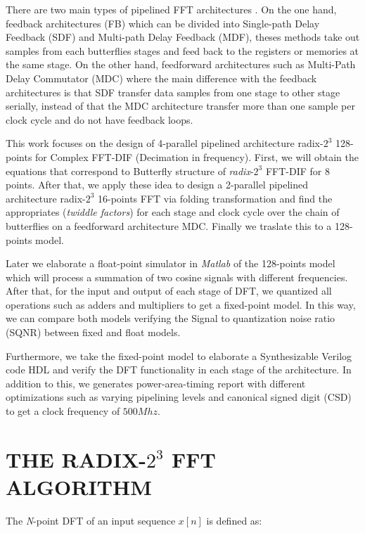 \documentclass[journal,comsoc]{IEEEtran}
\begin{document}
There are two main types of pipelined FFT architectures \cite{shousheng_he_designing_1998}. On the one hand, feedback architectures (FB) which can be divided into Single-path Delay Feedback (SDF) and Multi-path Delay Feedback (MDF), theses methods take out samples from each butterflies stages and feed back to the registers or memories at the same stage. On the other hand, feedforward architectures such as Multi-Path Delay Commutator (MDC) where the main difference with the feedback architectures is that SDF transfer data samples from one stage to other stage serially, instead of that the MDC architecture transfer more than one sample per clock cycle and do not have feedback loops.

This work focuses on the design of 4-parallel pipelined architecture radix-$2^3$ 128-points for Complex FFT-DIF (Decimation in frequency). First, we will obtain the equations that correspond to Butterfly structure of \textit{radix}-$2^3$ FFT-DIF for 8 points. After that, we apply these idea to design a 2-parallel pipelined architecture radix-$2^3$ 16-points FFT via folding transformation and find the appropriates (\textit{twiddle factors}) for each stage and clock cycle over the chain of butterflies on a feedforward architecture MDC. Finally we traslate this to a 128-points model. 

Later we elaborate a float-point simulator in \textit{Matlab} of the 128-points model which will process a summation of two cosine signals with different frequencies. After that, for the input and output of each stage of DFT, we quantized all operations such as adders and multipliers to get a fixed-point model. In this way, we can compare both models verifying the Signal to quantization noise ratio (SQNR) between fixed and float models.

Furthermore, we take the fixed-point model to elaborate a Synthesizable Verilog code HDL and verify the DFT functionality in each stage of the architecture. In addition to this, we generates power-area-timing report with different optimizations such as varying pipelining levels and canonical signed digit (CSD) to get a clock frequency of $500Mhz$.



\section{THE RADIX-$2^3$ FFT ALGORITHM}
The \textit{N}-point DFT of an input sequence $x[n]$ is defined as:
\end{document}
